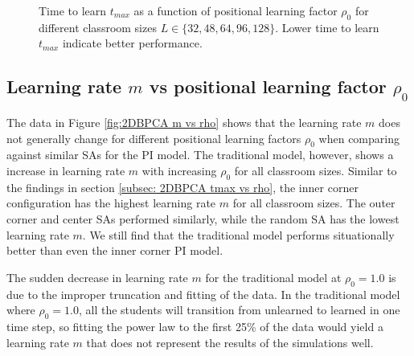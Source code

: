 \begin{figure}[htbp!]
    \caption{Time to learn $t_{max}$ as a function of positional learning factor $\rho_0$ for different classroom sizes $L \in \lbrace 32,48,64,96,128 \rbrace$. Lower time to learn $t_{max}$ indicate better performance.}
    \label{fig:2DBPCA tmax vs rho}
\end{figure}

\newpage

\subsection{Learning rate $m$ vs positional learning factor $\rho_0$}

The data in Figure \ref{fig:2DBPCA m vs rho} shows that the learning rate $m$ does not generally change for different positional learning factors $\rho_0$ when comparing against similar SAs for the PI model. The traditional model, however, shows a increase in learning rate $m$ with increasing $\rho_0$ for all classroom sizes. Similar to the findings in section \ref{subsec: 2DBPCA tmax vs rho}, the inner corner configuration has the highest learning rate $m$ for all classroom sizes. The outer corner and center SAs performed similarly, while the random SA has the lowest learning rate $m$. We still find that the traditional model performs situationally better than even the inner corner PI model. 

The sudden decrease in learning rate $m$ for the traditional model at $\rho_0 = 1.0$ is due to the improper truncation and fitting of the data. In the traditional model where $\rho_0 = 1.0$, all the students will transition from unlearned to learned in one time step, so fitting the power law to the first 25\% of the data would yield a learning rate $m$ that does not represent the results of the simulations well.

